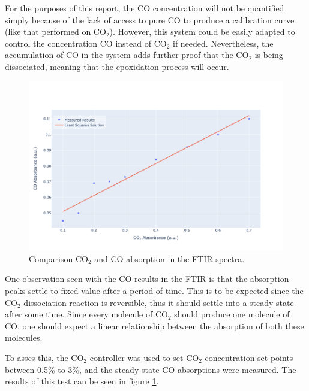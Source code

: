For the purposes of this report, the CO concentration will not be quantified simply because of the lack of access to pure CO to produce a calibration curve (like that performed on CO$_2$). However, this system could be easily adapted to control the concentration CO instead of CO$_2$ if needed. Nevertheless, the accumulation of CO in the system adds further proof that the CO$_2$ is being dissociated, meaning that the epoxidation process will occur.

\begin{figure}[h!]
	\centering
	\includegraphics[width=\linewidth]{chapter_5/figures/co2_vs_co_absorbance.png} 
	\caption{Comparison CO$_2$ and CO absorption in the FTIR spectra.}
	\label{fig:co2_vs_co_absorbance}
\end{figure} 

One observation seen with the CO results in the FTIR is that the absorption peaks settle to fixed value after a period of time. This is to be expected since the CO$_2$ dissociation reaction is reversible, thus it should settle into a steady state after some time. Since every molecule of CO$_2$ should produce one molecule of CO, one should expect a linear relationship between the absorption of both these molecules. 

To asses this, the CO$_2$ controller was used to set CO$_2$ concentration set points between 0.5\% to 3\%, and the steady state CO absorptions were measured. The results of this test can be seen in figure \ref{fig:co2_vs_co_absorbance}.

